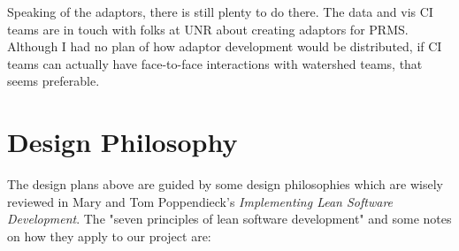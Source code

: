 \documentclass[
11pt, %
a4paper, %
oneside, %
twoside, %
headinclude,footinclude, %
BCOR5mm, %
]{scrartcl}
\begin{document}
Speaking of the adaptors, there is still plenty to do there. The data and vis CI teams are in
touch with folks at UNR about creating adaptors for PRMS. Although I had no plan of how 
adaptor development would be distributed, if CI teams can actually have face-to-face interactions
with watershed teams, that seems preferable.

\section{Design Philosophy} %
\label{sec:design_philosophies}
The design plans above are guided by some design philosophies which are wisely reviewed in 
Mary and Tom Poppendieck's \textit{Implementing Lean Software Development}. The "seven
principles of lean software development" and some notes on how they apply to our project are:
\end{document}
